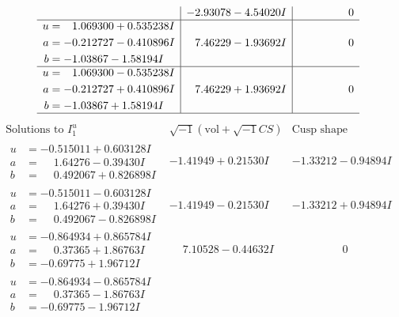 \documentclass[1p]{elsarticle_modified}
\theoremstyle{definition}
\newcommand{\I}{\sqrt{-1}}
\begin{document}
$$\begin{array}{c|c|c}
 & -2.93078 - 4.54020 I & \phantom{-0.000000 } 0 \\ \hline\begin{aligned}
u &= \phantom{-}1.069300 + 0.535238 I \\
a &= -0.212727 - 0.410896 I \\
b &= -1.03867 - 1.58194 I\end{aligned}
 & \phantom{-}7.46229 - 1.93692 I & \phantom{-0.000000 } 0 \\ \hline\begin{aligned}
u &= \phantom{-}1.069300 - 0.535238 I \\
a &= -0.212727 + 0.410896 I \\
b &= -1.03867 + 1.58194 I\end{aligned}
 & \phantom{-}7.46229 + 1.93692 I & \phantom{-0.000000 } 0\\
 \hline 
 \end{array}$$\newpage$$\begin{array}{c|c|c}  
\text{Solutions to }I^u_{1}& \I (\text{vol} + \sqrt{-1}CS) & \text{Cusp shape}\\
 \hline 
\begin{aligned}
u &= -0.515011 + 0.603128 I \\
a &= \phantom{-}1.64276 - 0.39430 I \\
b &= \phantom{-}0.492067 + 0.826898 I\end{aligned}
 & -1.41949 + 0.21530 I & -1.33212 - 0.94894 I \\ \hline\begin{aligned}
u &= -0.515011 - 0.603128 I \\
a &= \phantom{-}1.64276 + 0.39430 I \\
b &= \phantom{-}0.492067 - 0.826898 I\end{aligned}
 & -1.41949 - 0.21530 I & -1.33212 + 0.94894 I \\ \hline\begin{aligned}
u &= -0.864934 + 0.865784 I \\
a &= \phantom{-}0.37365 + 1.86763 I \\
b &= -0.69775 + 1.96712 I\end{aligned}
 & \phantom{-}7.10528 - 0.44632 I & \phantom{-0.000000 } 0 \\ \hline\begin{aligned}
u &= -0.864934 - 0.865784 I \\
a &= \phantom{-}0.37365 - 1.86763 I \\
b &= -0.69775 - 1.96712 I\end{aligned}

\end{array}$$
\end{document}
